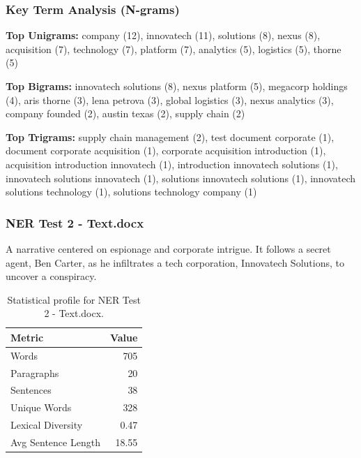 \subsubsection*{Key Term Analysis (N-grams)}
\textbf{Top Unigrams:} 
company (12), innovatech (11), solutions (8), nexus (8), acquisition (7), technology (7), platform (7), analytics (5), logistics (5), thorne (5)
\par
\textbf{Top Bigrams:} 
innovatech solutions (8), nexus platform (5), megacorp holdings (4), aris thorne (3), lena petrova (3), global logistics (3), nexus analytics (3), company founded (2), austin texas (2), supply chain (2)
\par
\textbf{Top Trigrams:} 
supply chain management (2), test document corporate (1), document corporate acquisition (1), corporate acquisition introduction (1), acquisition introduction innovatech (1), introduction innovatech solutions (1), innovatech solutions innovatech (1), solutions innovatech solutions (1), innovatech solutions technology (1), solutions technology company (1)

\subsubsection*{NER Test 2 - Text.docx}
A narrative centered on espionage and corporate intrigue. It follows a secret agent, Ben Carter, as he infiltrates a tech corporation, Innovatech Solutions, to uncover a conspiracy.

\begin{table}[!ht]
\centering
\begin{tabular}{lr}
\toprule
\textbf{Metric} & \textbf{Value} \\
\midrule
Words & 705 \\
Paragraphs & 20 \\
Sentences & 38 \\
Unique Words & 328 \\
Lexical Diversity & 0.47 \\
Avg Sentence Length & 18.55 \\
\bottomrule
\end{tabular}
\caption{Statistical profile for NER Test 2 - Text.docx.}
\label{tab:ner2_stats}
\end{table}

